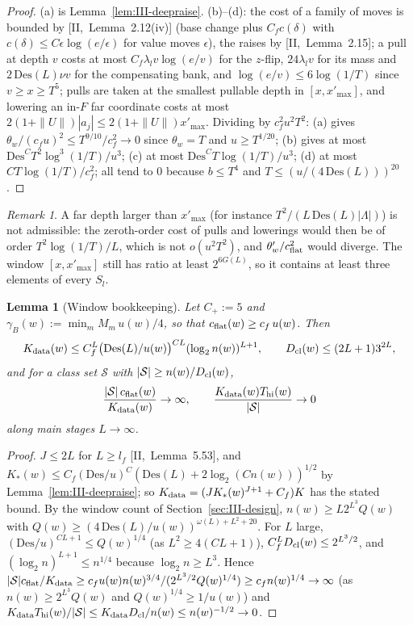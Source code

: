 \documentclass[10pt]{amsart}
\newtheorem{lemma}[theorem]{Lemma}
\theoremstyle{definition}
\theoremstyle{remark}
\newtheorem{remark}[theorem]{Remark}
\begin{document}
\begin{proof}
(a) is Lemma~\ref{lem:III-deepraise}.  (b)--(d): the cost of a family of moves
is bounded by [II,~Lemma~2.12(iv)] (base change plus $C_fc(\delta)$ with
$c(\delta)\le C\epsilon\log(e/\epsilon)$ for value moves $\epsilon$), the raises
by [II,~Lemma~2.15]; a pull at depth $v$ costs at most $C_f\lambda_lv\log(e/v)$
for the $z$-flip, $24\lambda_lv$ for its mass and $2\,\mathrm{Des}(L)\nu v$ for
the compensating bank, and $\log(e/v)\le6\log(1/T)$ since $v\ge x\ge T^5$;
pulls are taken at the smallest pullable depth in $[x,x'_{\max}]$, and lowering
an in-$F$ far coordinate costs at most $2(1+\|U\|)|a_j|\le2(1+\|U\|)x'_{\max}$.
Dividing by $c_f^2u^2T^2$: (a) gives $\theta_w/(c_fu)^2\le T^{9/10}/c_f^2\to0$ since
$\theta_w=T$ and $u\ge T^{1/20}$; (b) gives at most $\mathrm{Des}^C
T^2\log^3(1/T)/u^3$; (c) at most $\mathrm{Des}^CT\log(1/T)/u^3$; (d) at most
$CT\log(1/T)/c_f^2$; all tend to $0$ because $b\le T^4$ and $T\le
(u/(4\,\mathrm{Des}(L)))^{20}$.
\end{proof}

\begin{remark}\label{rem:III-costs}
A far depth larger than $x'_{\max}$ (for instance $T^2/(L\,\mathrm{Des}(L)|\Lambda|)$)
is not admissible: the zeroth-order cost of pulls and lowerings would then be of
order $T^2\log(1/T)/L$, which is not $o(u^2T^2)$, and $\theta'_w/c_{\rm flat}^2$
would diverge.  The window $[x,x'_{\max}]$ still has ratio at least $2^{6G(L)}$,
so it contains at least three elements of every $S_l$.
\end{remark}

\begin{lemma}[Window bookkeeping]\label{lem:III-bookkeeping}
Let $C_+:=5$ and $\gamma_B(w):=\min_mM_m\,u(w)/4$, so that
$c_{\rm flat}(w)\ge c_f\,u(w)$.  Then
\[
 K_{\rm data}(w)\le C_f^L\big(\mathrm{Des}(L)/u(w)\big)^{CL}(\log_2n(w))^{L+1},
 \qquad D_{\rm cl}(w)\le(2L+1)3^{2L},
\]
and for a class
set $\mathcal S$ with $|\mathcal S|\ge n(w)/D_{\rm cl}(w)$,
\[
 \frac{|\mathcal S|\,c_{\rm flat}(w)}{K_{\rm data}(w)}\to\infty,\qquad
 \frac{K_{\rm data}(w)T_{\rm hi}(w)}{|\mathcal S|}\to0
\]
along main stages $L\to\infty$.
\end{lemma}

\begin{proof}
$J\le2L$ for $L\ge l_f$ [II,~Lemma~5.53], and $K_*(w)\le C_f(\mathrm{Des}/u)^C
(\mathrm{Des}(L)+2\log_2(Cn(w)))^{1/2}$ by Lemma~\ref{lem:III-deepraise}; so
$K_{\rm data}=(JK_*(w)^{J+1}+C_f)K$ has the stated bound.  By the window count
of Section~\ref{sec:III-design}, $n(w)\ge L2^{L^3}Q(w)$ with $Q(w)\ge
(4\,\mathrm{Des}(L)/u(w))^{\omega(L)+L^2+20}$.  For $L$ large,
$(\mathrm{Des}/u)^{CL+1}\le Q(w)^{1/4}$ (as $L^2\ge4(CL+1)$), $C_f^LD_{\rm cl}(w)\le
2^{L^3/2}$, and $(\log_2n)^{L+1}\le n^{1/4}$ because $\log_2n\ge L^3$.  Hence
$|\mathcal S|c_{\rm flat}/K_{\rm data}\ge c_fu(w)n(w)^{3/4}/(2^{L^3/2}Q(w)^{1/4})
\ge c_fn(w)^{1/4}\to\infty$ (as $n(w)\ge2^{L^3}Q(w)$ and $Q(w)^{1/4}\ge1/u(w)$) and
$K_{\rm data}T_{\rm hi}(w)/|\mathcal S|\le K_{\rm data}D_{\rm cl}/n(w)\le n(w)^{-1/2}
\to0$.
\end{proof}
\end{document}
